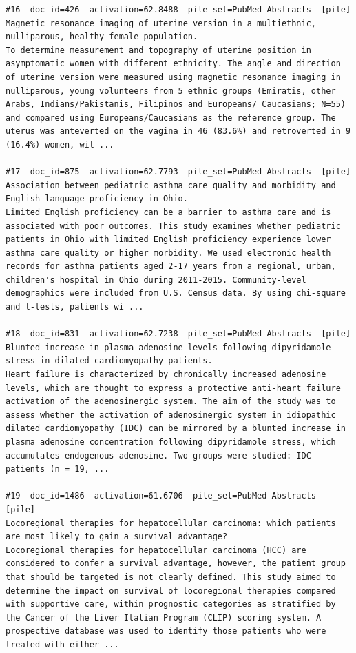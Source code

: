 \begin{verbatim}
#16  doc_id=426  activation=62.8488  pile_set=PubMed Abstracts  [pile]
Magnetic resonance imaging of uterine version in a multiethnic, nulliparous, healthy female population.
To determine measurement and topography of uterine position in asymptomatic women with different ethnicity. The angle and direction of uterine version were measured using magnetic resonance imaging in nulliparous, young volunteers from 5 ethnic groups (Emiratis, other Arabs, Indians/Pakistanis, Filipinos and Europeans/ Caucasians; N=55) and compared using Europeans/Caucasians as the reference group. The uterus was anteverted on the vagina in 46 (83.6%) and retroverted in 9 (16.4%) women, wit ...

#17  doc_id=875  activation=62.7793  pile_set=PubMed Abstracts  [pile]
Association between pediatric asthma care quality and morbidity and English language proficiency in Ohio.
Limited English proficiency can be a barrier to asthma care and is associated with poor outcomes. This study examines whether pediatric patients in Ohio with limited English proficiency experience lower asthma care quality or higher morbidity. We used electronic health records for asthma patients aged 2-17 years from a regional, urban, children's hospital in Ohio during 2011-2015. Community-level demographics were included from U.S. Census data. By using chi-square and t-tests, patients wi ...

#18  doc_id=831  activation=62.7238  pile_set=PubMed Abstracts  [pile]
Blunted increase in plasma adenosine levels following dipyridamole stress in dilated cardiomyopathy patients.
Heart failure is characterized by chronically increased adenosine levels, which are thought to express a protective anti-heart failure activation of the adenosinergic system. The aim of the study was to assess whether the activation of adenosinergic system in idiopathic dilated cardiomyopathy (IDC) can be mirrored by a blunted increase in plasma adenosine concentration following dipyridamole stress, which accumulates endogenous adenosine. Two groups were studied: IDC patients (n = 19, ...

#19  doc_id=1486  activation=61.6706  pile_set=PubMed Abstracts  [pile]
Locoregional therapies for hepatocellular carcinoma: which patients are most likely to gain a survival advantage?
Locoregional therapies for hepatocellular carcinoma (HCC) are considered to confer a survival advantage, however, the patient group that should be targeted is not clearly defined. This study aimed to determine the impact on survival of locoregional therapies compared with supportive care, within prognostic categories as stratified by the Cancer of the Liver Italian Program (CLIP) scoring system. A prospective database was used to identify those patients who were treated with either ...


\end{verbatim}
